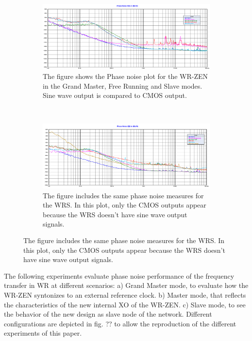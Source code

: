 \begin{figure}
    \centering
    \begin{subfigure}[t]{0.45\textwidth}
        \includegraphics[width=\textwidth]{../measures/img/zen_all}
        \caption[Phase noise plot of the WR-ZEN]{The figure shows the Phase noise plot for the WR-ZEN in the Grand Master, Free Running and Slave modes. Sine wave output is compared to CMOS output.}
        \label{fig:zen_pn_all}
    \end{subfigure}
    ~ %
    \begin{subfigure}[t]{0.45\textwidth}
         \includegraphics[width=\textwidth]{../measures/img/zen_vs_wrs}
         \caption[Phase noise plot of the WR-ZEN vs WRS]{The figure includes the same phase noise measures for the WRS. In this plot, only the CMOS outputs appear because the WRS doesn't have sine wave output signals.}
         \label{fig:zen_vs_wrs}
    \end{subfigure}
\end{figure}

The following experiments evaluate phase noise performance of the frequency transfer in WR at different scenarios: a) Grand Master mode, to evaluate how the WR-ZEN syntonizes to an external reference clock. b) Master mode, that reflects the characteristics of the new internal XO of the WR-ZEN. c) Slave mode, to see the behavior of the new design as slave node of the network. Different configurations are depicted in fig. ?? to allow the reproduction of the different experiments of this paper.

